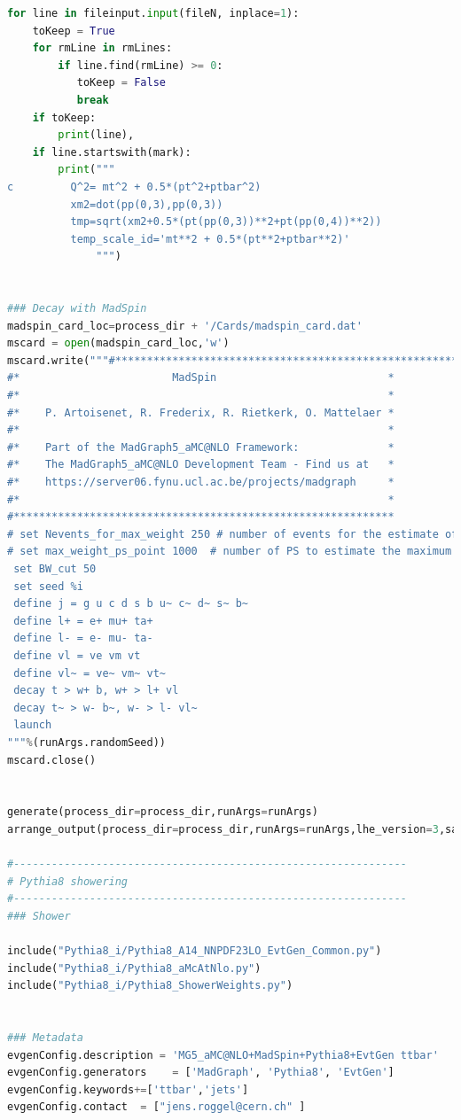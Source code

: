 \documentclass[NOTE, REPORT=true, atlasdraft=true, USenglish]{atlasdoc}
\begin{document}
\begin{lstlisting}[language=python, caption=$t\bar{t}$ job option python script]
for line in fileinput.input(fileN, inplace=1):
    toKeep = True
    for rmLine in rmLines:
        if line.find(rmLine) >= 0:
           toKeep = False
           break
    if toKeep:
        print(line),
    if line.startswith(mark):
        print("""
c         Q^2= mt^2 + 0.5*(pt^2+ptbar^2)
          xm2=dot(pp(0,3),pp(0,3))
          tmp=sqrt(xm2+0.5*(pt(pp(0,3))**2+pt(pp(0,4))**2))
          temp_scale_id='mt**2 + 0.5*(pt**2+ptbar**2)'
              """)


### Decay with MadSpin
madspin_card_loc=process_dir + '/Cards/madspin_card.dat'
mscard = open(madspin_card_loc,'w')
mscard.write("""#************************************************************
#*                        MadSpin                           *
#*                                                          *
#*    P. Artoisenet, R. Frederix, R. Rietkerk, O. Mattelaer *
#*                                                          *
#*    Part of the MadGraph5_aMC@NLO Framework:              *
#*    The MadGraph5_aMC@NLO Development Team - Find us at   *
#*    https://server06.fynu.ucl.ac.be/projects/madgraph     *
#*                                                          *
#************************************************************
# set Nevents_for_max_weight 250 # number of events for the estimate of the max. weight
# set max_weight_ps_point 1000  # number of PS to estimate the maximum for each event
 set BW_cut 50
 set seed %i
 define j = g u c d s b u~ c~ d~ s~ b~
 define l+ = e+ mu+ ta+
 define l- = e- mu- ta-
 define vl = ve vm vt
 define vl~ = ve~ vm~ vt~
 decay t > w+ b, w+ > l+ vl
 decay t~ > w- b~, w- > l- vl~
 launch
"""%(runArgs.randomSeed))
mscard.close()


generate(process_dir=process_dir,runArgs=runArgs)
arrange_output(process_dir=process_dir,runArgs=runArgs,lhe_version=3,saveProcDir=False)  

#--------------------------------------------------------------
# Pythia8 showering
#--------------------------------------------------------------
### Shower

include("Pythia8_i/Pythia8_A14_NNPDF23LO_EvtGen_Common.py")
include("Pythia8_i/Pythia8_aMcAtNlo.py")
include("Pythia8_i/Pythia8_ShowerWeights.py")


### Metadata
evgenConfig.description = 'MG5_aMC@NLO+MadSpin+Pythia8+EvtGen ttbar'
evgenConfig.generators    = ['MadGraph', 'Pythia8', 'EvtGen']
evgenConfig.keywords+=['ttbar','jets']
evgenConfig.contact  = ["jens.roggel@cern.ch" ]
\end{lstlisting}
\end{document}
